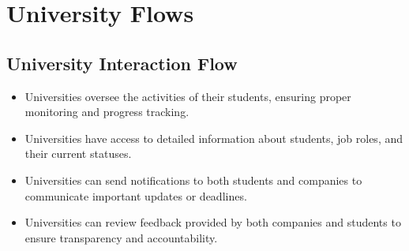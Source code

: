 \section{University Flows}

\subsection{University Interaction Flow}
\begin{itemize}
    \item Universities oversee the activities of their students, ensuring proper monitoring and progress tracking.
    \item Universities have access to detailed information about students, job roles, and their current statuses.
    \item Universities can send notifications to both students and companies to communicate important updates or deadlines.
    \item Universities can review feedback provided by both companies and students to ensure transparency and accountability.
\end{itemize}

